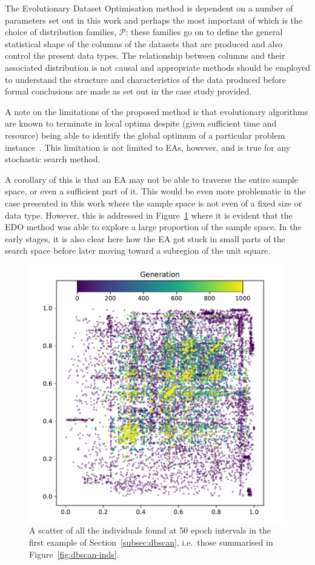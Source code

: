 \documentclass[smallextended]{svjour3}
\newlength{\imgwidth}
\begin{document}
The Evolutionary Dataset Optimisation method is dependent on a number of
parameters set out in this work and perhaps the most important of which is the
choice of distribution families, \(\mathcal{P}\); these families go on to define
the general statistical shape of the columns of the datasets that are produced
and also control the present data types. The relationship between columns and
their associated distribution is not causal and appropriate methods should be
employed to understand the structure and characteristics of the data produced
before formal conclusions are made as set out in the case study provided.

A note on the limitations of the proposed method is that evolutionary algorithms
are known to terminate in local optima despite (given sufficient time and
resource) being able to identify the global optimum of a particular problem
instance~\cite{Vikhar2016}. This limitation is not limited to EAs, however,
and is true for any stochastic search method.

A corollary of this is that an EA may not be able to traverse the entire sample
space, or even a sufficient part of it. This would be even more problematic in
the case presented in this work where the sample space is not even of a fixed
size or data type. However, this is addressed in Figure~\ref{fig:coverage} where
it is evident that the EDO method was able to explore a large proportion of the
sample space. In the early stages, it is also clear here how the EA got stuck in
small parts of the search space before later moving toward a subregion of the
unit square.

\begin{figure}[htbp]
    \includegraphics[width=\imgwidth]{Fig15.pdf}
    \caption{%
        A scatter of all the individuals found at 50 epoch intervals in the
        first example of Section~\ref{subsec:dbscan}, i.e.\ those summarised in
        Figure~\ref{fig:dbscan-inds}.
    }\label{fig:coverage}
\end{figure}
\end{document}
